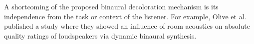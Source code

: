 A shortcoming of the proposed binaural decoloration mechanism is its
independence from the task or context of the listener. For example, Olive et
al.\autocite{Olive1995} published a study where they showed an influence of room
acoustics on absolute quality ratings
of loudspeakers via dynamic binaural
synthesis.

